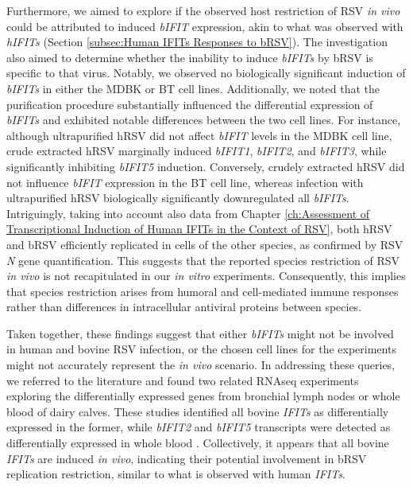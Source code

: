 Furthermore, we aimed to explore if the observed host restriction of RSV \textit{in vivo} could be attributed to induced \textit{bIFIT} expression, akin to what was observed with \textit{hIFITs} (Section \ref{subsec:Human IFITs Responses to bRSV}). The investigation also aimed to determine whether the inability to induce \textit{bIFITs} by bRSV is specific to that virus. Notably, we observed no biologically significant induction of \textit{bIFITs} in either the MDBK or BT cell lines. Additionally, we noted that the purification procedure substantially influenced the differential expression of \textit{bIFITs} and exhibited notable differences between the two cell lines. For instance, although ultrapurified hRSV did not affect \textit{bIFIT} levels in the MDBK cell line, crude extracted hRSV marginally induced \textit{bIFIT1}, \textit{bIFIT2}, and \textit{bIFIT3}, while significantly inhibiting \textit{bIFIT5} induction. Conversely, crudely extracted hRSV did not influence \textit{bIFIT} expression in the BT cell line, whereas infection with ultrapurified hRSV biologically significantly downregulated all \textit{bIFITs}. Intriguingly, taking into account also data from Chapter \ref{ch:Assessment of Transcriptional Induction of Human IFITs in the Context of RSV}, both hRSV and bRSV efficiently replicated in cells of the other species, as confirmed by RSV \textit{N} gene quantification. This suggests that the reported species restriction of RSV \textit{in vivo} is not recapitulated in our \textit{in vitro} experiments. Consequently, this implies that species restriction arises from humoral and cell-mediated immune responses rather than differences in intracellular antiviral proteins between species.

Taken together, these findings suggest that either \textit{bIFITs} might not be involved in human and bovine RSV infection, or the chosen cell lines for the experiments might not accurately represent the \textit{in vivo} scenario. In addressing these queries, we referred to the literature and found two related RNAseq experiments exploring the differentially expressed genes from bronchial lymph nodes or whole blood of dairy calves. These studies identified all bovine \textit{IFITs} as differentially expressed in the former, while \textit{bIFIT2} and \textit{bIFIT5} transcripts were detected as differentially expressed in whole blood \cite{Johnston2019ExperimentalResponse., Johnston2021MessengerCalves}. Collectively, it appears that all bovine \textit{IFITs} are induced \textit{in vivo}, indicating their potential involvement in bRSV replication restriction, similar to what is observed with human \textit{IFITs}.

